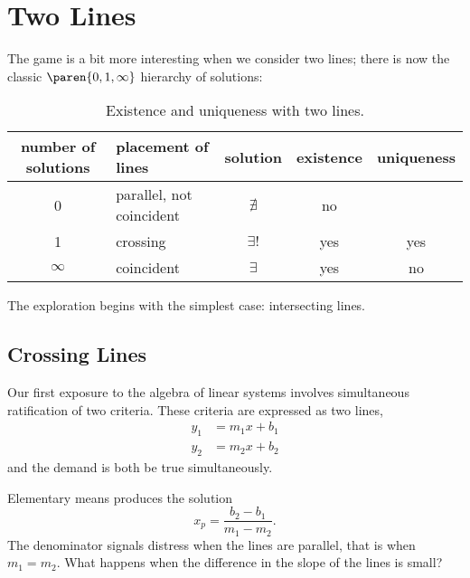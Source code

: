 \section{Two Lines}  %
The game is a bit more interesting when we consider two lines; there is now the classic $\paren{0,1,\infty}$ hierarchy of solutions:
  \begin{table}[htbp]  %
    \caption{Existence and uniqueness with two lines.}
    \begin{center}
      \begin{tabular}{clccc}
        number of solutions & placement of lines & solution & existence & uniqueness \\\hline
        0 & parallel, not coincident  & $\nexists$ & no \\
        1 & crossing  & $\exists!$ & yes & yes \\
        $\infty$ & coincident  & $\exists$ & yes & no
      \end{tabular}
    \end{center}
  \end{table}%

The exploration begins with the simplest case: intersecting lines.

\subsection{Crossing Lines}  %
Our first exposure to the algebra of linear systems involves simultaneous ratification of two criteria. These criteria are expressed as two lines,
  \begin{equation*}   %
    \begin{split}
      y_{1} &= m_{1}x + b_{1} \\
      y_{2} &= m_{2}x + b_{2}
    \end{split}
  \end{equation*}
and the demand is both be true simultaneously.

Elementary means produces the solution
  \begin{equation}   %
    x_{p} = \frac{b_{2} - b_{1}} {m_{1} - m_{2}}.
    \label{eq:crossing}
  \end{equation}
The denominator signals distress when the lines are parallel, that is when $m_{1} = m_{2}$. What happens when the difference in the slope of the lines is small?


